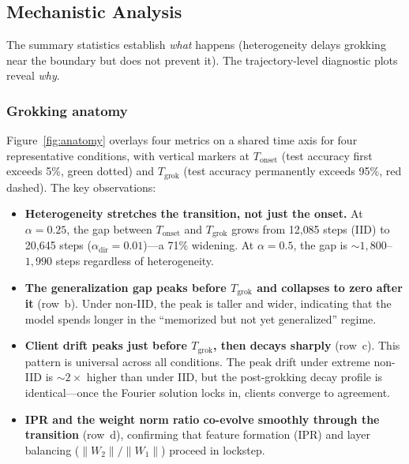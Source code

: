 \documentclass[11pt]{article}
\begin{document}
\subsection{Mechanistic Analysis}
\label{sec:exp3-mech}

The summary statistics establish \emph{what} happens (heterogeneity delays
grokking near the boundary but does not prevent it).  The trajectory-level
diagnostic plots reveal \emph{why}.

\subsubsection{Grokking anatomy}

Figure~\ref{fig:anatomy} overlays four metrics on a shared time axis for four
representative conditions, with vertical markers at $T_{\mathrm{onset}}$
(test accuracy first exceeds 5\%, green dotted) and $T_{\mathrm{grok}}$
(test accuracy permanently exceeds 95\%, red dashed).  The key observations:

\begin{itemize}
  \item \textbf{Heterogeneity stretches the transition, not just the onset.}
        At $\alpha{=}0.25$, the gap between $T_{\mathrm{onset}}$ and
        $T_{\mathrm{grok}}$ grows from 12{,}085 steps (IID) to 20{,}645 steps
        ($\alpha_{\mathrm{dir}}{=}0.01$)---a 71\% widening.  At $\alpha{=}0.5$,
        the gap is ${\sim}1{,}800$--$1{,}990$ steps regardless of heterogeneity.

  \item \textbf{The generalization gap peaks before $T_{\mathrm{grok}}$ and
        collapses to zero after it} (row~b).  Under non-IID, the peak is
        taller and wider, indicating that the model spends longer in the
        ``memorized but not yet generalized'' regime.

  \item \textbf{Client drift peaks just before $T_{\mathrm{grok}}$, then
        decays sharply} (row~c).  This pattern is universal across all
        conditions.  The peak drift under extreme non-IID is ${\sim}2\times$
        higher than under IID, but the post-grokking decay profile is
        identical---once the Fourier solution locks in, clients converge to
        agreement.

  \item \textbf{IPR and the weight norm ratio co-evolve smoothly through the
        transition} (row~d), confirming that feature formation (IPR) and
        layer balancing ($\|W_2\|/\|W_1\|$) proceed in lockstep.
\end{itemize}
\end{document}
